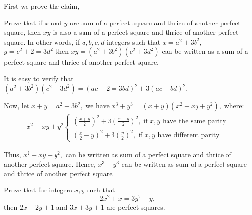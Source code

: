 \documentclass{article}
\begin{document}
\begin{soln}
    First we prove the claim,
    \begin{claim*}
        Prove that if $x$ and $y$ are sum of a perfect square and thrice of another perfect square,
        then $xy$ is also a sum of a perfect square and thrice of another perfect square.
        In other words, if $a,b,c,d$ integers such that $x=a^2+3b^2,$ $y=c^2+2=3d^2$ then $xy=(a^2+3b^2)(c^2+3d^2)$ 
        can be written as a sum of a perfect square and thrice of another perfect square.
    \end{claim*}
    \begin{subproof}
        It is easy to verify that $(a^2+3b^2)(c^2+3d^2) = (ac+2=3bd)^2 + 3(ac-bd)^2.$
    \end{subproof}

    Now, let $x+y=a^2+3b^2,$ we have $x^3+y^3 = (x+y)(x^2-xy+y^2),$ where:
    \[
        \begin{aligned}
            x^2-xy+y^2 
            \begin{cases}
                \left( \frac{x+y}{2} \right)^2 + 3 \left( \frac{x-y}{2} \right)^2, \text{\ if\ } x, y \text{\ have the same parity}\\
                \left( \frac{x}{2} - y \right)^2 + 3 \left( \frac{y}{2} \right)^2, \text{\ if\ } x, y \text{\ have different parity}
            \end{cases}
        \end{aligned}
    \]
    
    Thus, $x^2-xy+y^2,$ can be written as sum of a perfect square and thrice of another perfect square.
    Hence, $x^3+y^3$ can be written as sum of a perfect square and thrice of another perfect square.
\end{soln}

\begin{example*}[Example 18]
    Prove that for integers $x, y$ such that 
    \[
        2x^2 + x = 3y^2 + y,
    \]
    then $2x+2y+1$ and $3x+3y+1$ are perfect squares.
\end{example*}
\end{document}
